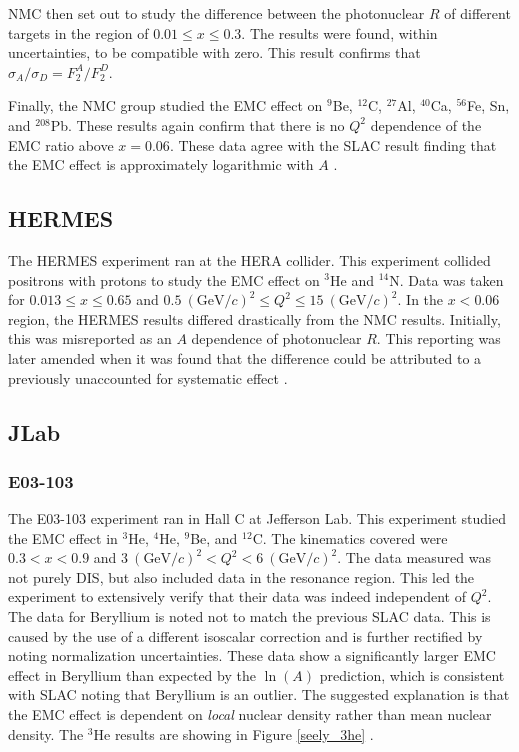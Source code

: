 NMC then set out to study the difference between the photonuclear $R$ of different targets in the region of $0.01 \leq x \leq 0.3$. The results were found, within uncertainties, to be compatible with zero. This result confirms that $\sigma_A / \sigma_D=F_2^A / F_2^D$.

Finally, the NMC group studied the EMC effect on $^9$Be, $^{12}$C, $^{27}$Al, $^{40}$Ca, $^{56}$Fe, Sn, and $^{208}$Pb. These results again confirm that there is no $Q^2$ dependence of the EMC ratio above $x=0.06$. These data agree with the SLAC result finding that the EMC effect is approximately logarithmic with $A$ \cite{NMC}.


\subsection{HERMES}
The HERMES experiment ran at the HERA collider. This experiment collided positrons with protons to study the EMC effect on $^3$He and $^{14}$N. Data was taken for $0.013 \le x \le 0.65$ and $0.5\ \left(\textrm{GeV}/c\right)^2 \le Q^2 \le 15\ \left(\textrm{GeV}/c\right)^2$. In the $x<0.06$ region, the HERMES results differed drastically from the NMC results. Initially, this was misreported as an $A$ dependence of photonuclear $R$. This reporting was later amended when it was found that the difference could be attributed to a previously unaccounted for systematic effect \cite{hermes,hermes_errata}.

\subsection{JLab}

\subsubsection{E03-103}
The E03-103 experiment ran in Hall C at Jefferson Lab. This experiment studied the EMC effect in $^3$He, $^4$He, $^9$Be, and $^{12}$C. The kinematics covered were $0.3 < x < 0.9$ and $3\ \left(\textrm{GeV}/c\right)^2 < Q^2 < 6\ \left(\textrm{GeV}/c\right)^2$. The data measured was not purely DIS, but also included data in the resonance region. This led the experiment to extensively verify that their data was indeed independent of $Q^2$. The data for Beryllium is noted not to match the previous SLAC data. This is caused by the use of a different isoscalar correction and is further rectified by noting normalization uncertainties. These data show a significantly larger EMC effect in Beryllium than expected by the $\ln\left(A\right)$ prediction, which is consistent with SLAC noting that Beryllium is an outlier. The suggested explanation is that the EMC effect is dependent on \textit{local} nuclear density rather than mean nuclear density. The $^3$He results are showing in Figure \ref{seely_3he} \cite{e03103}.

